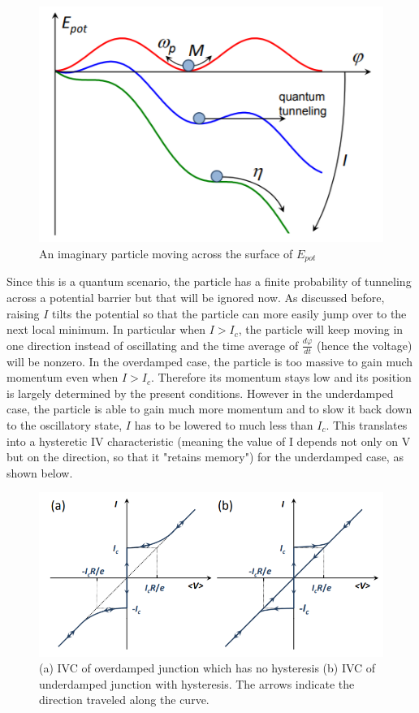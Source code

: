 \documentclass[conf]{new-aiaa}
\begin{document}
\begin{figure}[!ht]
    \centering
    \includegraphics[scale = 0.6]{washboardParticle.PNG}
    \caption{An imaginary particle moving across the surface of $E_{pot}$}
    \label{fig:my_label}
\end{figure}

Since this is a quantum scenario, the particle has a finite probability of tunneling across a potential barrier but that will be ignored now. As discussed before, raising $I$ tilts the potential so that the particle can more easily jump over to the next local minimum. In particular when $I > I_c$, the particle will keep moving in one direction instead of oscillating and the time average of $\frac{d\varphi}{dt}$ (hence the voltage) will be nonzero.  
In the overdamped case, the particle is too massive to gain much momentum even when $I > I_c$. Therefore its momentum stays low and its position is largely determined by the present conditions. However in the underdamped case, the particle is able to gain much more momentum and to slow it back down to the oscillatory state, $I$ has to be lowered to much less than $I_c$. This translates into a hysteretic IV characteristic (meaning the value of I depends not only on V but on the direction, so that it "retains memory") for the underdamped case, as shown below. 

\begin{figure}[!ht]
    \centering
    \includegraphics[scale = 0.7]{ivChars.PNG}
    \caption{(a) IVC of overdamped junction which has no hysteresis (b) IVC of underdamped junction with hysteresis. The arrows indicate the direction traveled along the curve.}
    \label{fig:my_label}
\end{figure}
\end{document}
